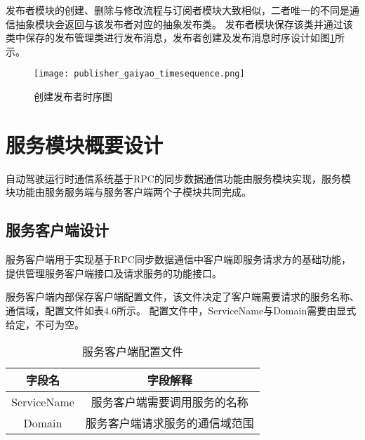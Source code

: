 发布者模块的创建、删除与修改流程与订阅者模块大致相似，二者唯一的不同是通信抽象模块会返回与该发布者对应的抽象发布类。
发布者模块保存该类并通过该类中保存的发布管理类进行发布消息，发布者创建及发布消息时序设计如图\ref{publisher_gaiyao_timesequence}所示。

\begin{figure}[H]
  \centering
  \texttt{[image: publisher\_gaiyao\_timesequence.png]}
  \caption{创建发布者时序图}
  \label{publisher_gaiyao_timesequence}
\end{figure}

\section{服务模块概要设计}
自动驾驶运行时通信系统基于RPC的同步数据通信功能由服务模块实现，服务模块功能由服务服务端与服务客户端两个子模块共同完成。

\subsection{服务客户端设计}
服务客户端用于实现基于RPC同步数据通信中客户端即服务请求方的基础功能，提供管理服务客户端接口及请求服务的功能接口。

服务客户端内部保存客户端配置文件，该文件决定了客户端需要请求的服务名称、通信域，配置文件如表4.6所示。
配置文件中，ServiceName与Domain需要由显式给定，不可为空。
\begin{table}[H]
  \centering\small
  \caption{服务客户端配置文件}
  \label{tab:exampletable}
  \begin{tabular}{cc}
    \toprule
    字段名 & 字段解释 \\
    \midrule
    ServiceName & 服务客户端需要调用服务的名称\\
    Domain & 服务客户端请求服务的通信域范围\\
    \bottomrule
  \end{tabular}
\end{table}

